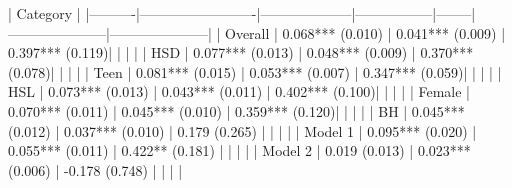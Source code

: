 | Category | %
|----------|-------------------------|--------------------|-----------------|--------|---------------------|---------------------|
| Overall  | 0.068*** (0.010)         | 0.041*** (0.009)   | 0.397*** (0.119)|        |                     |                     |
| HSD      | 0.077*** (0.013)         | 0.048*** (0.009)   | 0.370*** (0.078)|        |                     |                     |
| Teen     | 0.081*** (0.015)         | 0.053*** (0.007)   | 0.347*** (0.059)|        |                     |                     |
| HSL      | 0.073*** (0.013)         | 0.043*** (0.011)   | 0.402*** (0.100)|        |                     |                     |
| Female   | 0.070*** (0.011)         | 0.045*** (0.010)   | 0.359*** (0.120)|        |                     |                     |
| BH       | 0.045*** (0.012)         | 0.037*** (0.010)   | 0.179 (0.265)   |        |                     |                     |
| Model 1  | 0.095*** (0.020)         | 0.055*** (0.011)   | 0.422** (0.181) |        |                     |                     |
| Model 2  | 0.019 (0.013)            | 0.023*** (0.006)   | -0.178 (0.748)  |        |                     |                     |
